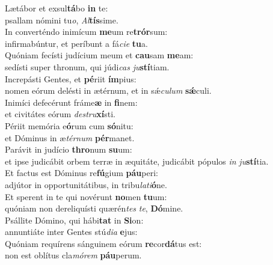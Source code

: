 \evenverse Lætábor et exsul\textbf{tá}bo \textbf{in} te:~\*\\
\evenverse psallam nómini tu\textit{o}, \textit{Al}\textbf{tís}sime.\\
\oddverse In converténdo inimícum \textbf{me}um re\textbf{trór}sum:~\*\\
\oddverse infirmabúntur, et períbunt a fá\textit{ci}\textit{e} \textbf{tu}a.\\
\evenverse Quóniam fecísti judícium meum et \textbf{cau}sam \textbf{me}am:~\*\\
\evenverse sedísti super thronum, qui júdi\textit{cas} \textit{ju}\textbf{stí}tiam.\\
\oddverse Increpásti Gentes, et \textbf{pé}riit \textbf{ím}pius:~\*\\
\oddverse nomen eórum delésti in ætérnum, et in sǽ\textit{cu}\textit{lum} \textbf{sǽ}culi.\\
\evenverse Inimíci defecérunt fráme\textbf{æ} in \textbf{fi}nem:~\*\\
\evenverse et civitátes eórum \textit{de}\textit{stru}\textbf{xí}sti.\\
\oddverse Périit memória e\textbf{ó}rum cum \textbf{só}nitu:~\*\\
\oddverse et Dóminus in æ\textit{tér}\textit{num} \textbf{pér}manet.\\
\evenverse Parávit in judício \textbf{thro}num \textbf{su}um:~\*\\
\evenverse et ipse judicábit orbem terræ in æquitáte, judicábit pópulos \textit{in} \textit{ju}\textbf{stí}tia.\\
\oddverse Et factus est Dóminus re\textbf{fú}gium \textbf{páu}peri:~\*\\
\oddverse adjútor in opportunitátibus, in tribu\textit{la}\textit{ti}\textbf{ó}ne.\\
\evenverse Et sperent in te qui novérunt \textbf{no}men \textbf{tu}um:~\*\\
\evenverse quóniam non dereliquísti quærén\textit{tes} \textit{te}, \textbf{Dó}mine.\\
\oddverse Psállite Dómino, qui hábi\textbf{tat} in \textbf{Si}on:~\*\\
\oddverse annuntiáte inter Gentes stú\textit{di}\textit{a} \textbf{e}jus:\\
\evenverse Quóniam requírens sánguinem eórum \textbf{re}cor\textbf{dá}tus est:~\*\\
\evenverse non est oblítus cla\textit{mó}\textit{rem} \textbf{páu}perum.\\
